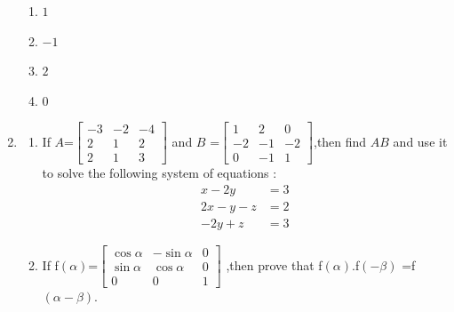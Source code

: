 \documentclass[12pt,-letter paper]{article}
\providecommand{\myvec}[1]{\ensuremath{\begin{bmatrix}#1\end{bmatrix}}}
\begin{document}
\begin{enumerate}
\begin{enumerate}[label=(\alph*)]
    \item $1$
    \item $-1$
    \item $2$
    \item $0$
\end{enumerate}
\item\begin{enumerate}[label=(\alph*)]
    \item If $A$=$\myvec{ -3 & -2 & -4\\2 & 1 & 2\\2 & 1 & 3}$
and $B$ =$\myvec{  1 & 2 & 0\\-2 & -1 & -2\\0 & -1 & 1}$,then find $AB$ and use it to solve the following system of equations :
\begin{align} x - 2y &= 3\\2x - y - z &= 2\\-2y + z &= 3\end{align}
\item If f\((\alpha)\)=$\myvec{
    \cos\alpha & -\sin\alpha & 0\\
    \sin\alpha & \cos\alpha & 0\\
    0 & 0 & 1}$
 ,then prove that
     f\((\alpha)\).f\((-\beta)\) =f\((\alpha - \beta)\).
\end{enumerate}
 \end{enumerate}
\end{document}
